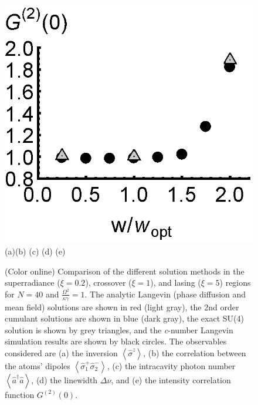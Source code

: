 \documentclass[aps,
twocolumn,
superscriptaddress,groupedaddress]{revtex4}
\begin{document}
\begin{figure}
\begin{center}
	\hspace{-5.0mm} \includegraphics[scale =0.38] {N40LaserG2.eps}\\ \vspace{1mm}
	\hspace{5mm}(a)\hspace{30mm}(b) \hspace{30mm}(c) \hspace{30mm}(d) \hspace{30mm}(e)
\end{center}
		\vspace{-5mm}
\caption{(Color online) Comparison of the different solution methods in
the superradiance ($\xi=0.2$), crossover ($\xi=1$), and lasing ($\xi=5$)
regions for $N=40$ and $\frac{\Omega^2}{\kappa \gamma}=1$.  The analytic
Langevin (phase diffusion and mean field) solutions are shown in red
(light gray), the 2nd order cumulant solutions are shown in blue (dark
gray), the exact SU(4) solution is shown by grey triangles, and the {\it
c}-number Langevin simulation results are shown by black circles. The
observables considered are (a) the inversion
$\left<\hat{\sigma}^{z}\right>$, (b) the correlation between the atoms'
dipoles $\left<\hat{\sigma}_{1}^{+} \hat{\sigma}_{2}^{-}\right>$, (c)
the intracavity photon number  $\left<\hat{a}^{\dagger}\hat{a}\right>$,
(d) the linewidth $\Delta \nu$, and (e) the intensity correlation
function $G^{(2)}(0)$.}
\label{N40Comparison}
\end{figure}
\end{document}
